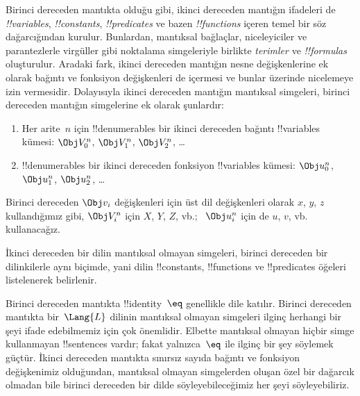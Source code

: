 



Birinci dereceden mantıkta olduğu gibi, ikinci dereceden mantığın ifadeleri
de \emph{!!{variable}s}, \emph{!!{constant}s}, \emph{!!{predicate}s} ve
bazen \emph{!!{function}s} içeren temel bir söz dağarcığından kurulur.
Bunlardan, mantıksal bağlaçlar, niceleyiciler ve parantezlerle virgüller gibi
noktalama simgeleriyle birlikte \emph{terimler} ve \emph{!!{formula}s}
oluşturulur. Aradaki fark, ikinci dereceden mantığın nesne değişkenlerine ek
olarak bağıntı ve fonksiyon değişkenleri de içermesi ve bunlar üzerinde
nicelemeye izin vermesidir. Dolayısıyla ikinci dereceden mantığın mantıksal
simgeleri, birinci dereceden mantığın simgelerine ek olarak şunlardır:

\begin{enumerate}
\item Her arite~$n$ için !!{denumerable}s bir ikinci dereceden bağıntı
  !!{variable}s kümesi: $\Obj V_0^n$, $\Obj V_1^n$, $\Obj V_2^n$, \dots
\item !!{denumerable}s bir ikinci dereceden fonksiyon !!{variable}s kümesi:
  $\Obj u_0^n$, $\Obj u_1^n$, $\Obj u_2^n$, \dots
\end{enumerate}

Birinci dereceden $\Obj v_i$ değişkenleri için üst dil değişkenleri olarak
$x$, $y$, $z$ kullandığımız gibi, $\Obj V_i^n$ için $X$, $Y$, $Z$, vb.;
~$\Obj u_i^n$ için de $u$, $v$, vb. kullanacağız.

\begin{explain}
İkinci dereceden bir dilin mantıksal olmayan simgeleri, birinci dereceden
bir dilinkilerle aynı biçimde, yani dilin !!{constant}s, !!{function}s ve
!!{predicate}s öğeleri listelenerek belirlenir.

Birinci dereceden mantıkta !!{identity}~$\eq$ genellikle dile katılır.
Birinci dereceden mantıkta bir~$\Lang{L}$ dilinin mantıksal olmayan
simgeleri ilginç herhangi bir şeyi ifade edebilmemiz için çok önemlidir.
Elbette mantıksal olmayan hiçbir simge kullanmayan !!{sentence}s vardır;
fakat yalnızca~$\eq$ ile ilginç bir şey söylemek güçtür. İkinci dereceden
mantıkta sınırsız sayıda bağıntı ve fonksiyon değişkenimiz olduğundan,
mantıksal olmayan simgelerden oluşan özel bir dağarcık olmadan bile birinci
dereceden bir dilde söyleyebileceğimiz her şeyi söyleyebiliriz.
\end{explain}

